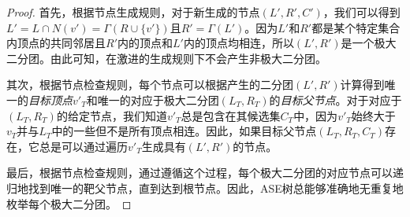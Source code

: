 \begin{proof}
  首先，根据节点生成规则，对于新生成的节点$(L',R',C')$，我们可以得到$L'=L\cap N(v')=\Gamma(R\cup\{v'\})$且$R'=\Gamma(L')$。因为$L'$和$R'$都是某个特定集合内顶点的共同邻居且$R'$内的顶点和$L'$内的顶点均相连，所以$(L',R')$是一个极大二分团。由此可知，在激进的生成规则下不会产生非极大二分团。

  其次，根据节点检查规则，每个节点可以根据产生的二分团$(L',R')$计算得到唯一的\emph{目标顶点$v'_T$}和唯一的对应于极大二分团$(L_T, R_T)$的\emph{目标父节点}。对于对应于$(L_T, R_T)$的给定节点，我们知道$v'_T$总是包含在其候选集$C_T$中，因为$v'_T$始终大于$v_T$并与$L_T$中的一些但不是所有顶点相连。因此，如果目标父节点$(L_T,R_T,C_T)$存在，它总是可以通过遍历$v'_T$生成具有$(L', R')$的节点。
  
  
  
  最后，根据节点检查规则，通过遵循这个过程，每个极大二分团的对应节点可以递归地找到唯一的靶父节点，直到达到根节点。因此，ASE树总能够准确地无重复地枚举每个极大二分团。
\end{proof}





